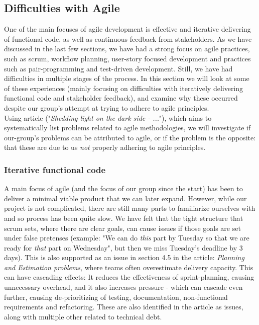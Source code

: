 \subsection*{Difficulties with Agile}
One of the main focuses of agile development is effective and iterative delivering of functional code, as well as continuous feedback from stakeholders. 
As we have discussed in the last few sections, we have had a strong focus on agile practices, such as scrum, workflow planning, user-story focused development and practices such as pair-programming and test-driven development. 
Still, we have had difficulties in multiple stages of the process. In this section we will look at some of these experiences (mainly focusing on difficulties with iteratively delivering functional code and stakeholder feedback), and examine why these occurred despite our group's attempt at trying to adhere to agile principles.
\vspace{5mm}\\
Using article \cite{DarkSide} ("\textit{Shedding light on the dark side - ..}."), which aims to systematically list problems related to agile methodologies, we will  investigate if our-group's problems can be attributed to agile, or if the problem is the opposite: that these are due to us \textit{not} properly adhering to agile principles.


\subsubsection{Iterative functional code}
A main focus of agile (and the focus of our group since the start) has been to deliver a minimal viable product that we can later expand. However, while our project is not complicated, there are still many parts to familiarize ourselves with and so process has been quite slow. We have felt that the tight structure that scrum sets, where there are clear goals, can cause issues if those goals are set under false pretenses (example: "We can do \textit{this} part by Tuesday so that we are ready for \textit{that} part on Wednesday", but then we miss Tuesday's deadline by 3 days). This is also supported as an issue in section 4.5 in the article\cite{DarkSide}: \textit{Planning and Estimation problems}, where teams often overestimate delivery capacity. This can have cascading effects: It reduces the effectiveness of sprint-planning, causing unnecessary overhead, and it also increases pressure - which can cascade even further, causing de-prioritizing of testing, documentation, non-functional requirements and refactoring. These are also identified in the article as issues, along with multiple other related to technical debt.

